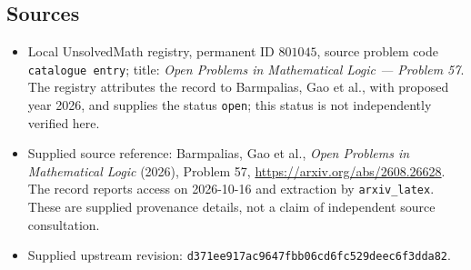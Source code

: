 \documentclass[11pt]{article}
\begin{document}
\subsection{Sources}
\begin{itemize}
\item Local UnsolvedMath registry, permanent ID \(801045\), source problem code \texttt{catalogue entry}; title: \emph{Open Problems in Mathematical Logic --- Problem 57}. The registry attributes the record to Barmpalias, Gao et al., with proposed year 2026, and supplies the status \texttt{open}; this status is not independently verified here.
\item Supplied source reference: Barmpalias, Gao et al., \emph{Open Problems in Mathematical Logic} (2026), Problem 57, \url{https://arxiv.org/abs/2608.26628}. The record reports access on 2026-10-16 and extraction by \texttt{arxiv\_latex}. These are supplied provenance details, not a claim of independent source consultation.
\item Supplied upstream revision: \texttt{d371ee917ac9647fbb06cd6fc529deec6f3dda82}.
\end{itemize}
\end{document}
